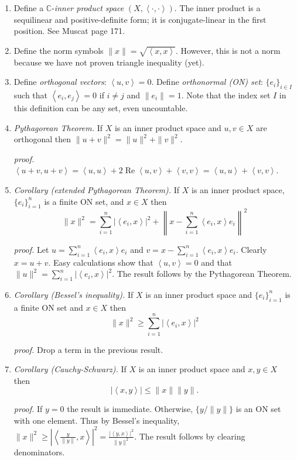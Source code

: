 \documentclass[11pt]{article}
\newcommand{\CC}{\mathbb{C}}
\renewcommand{\Re}{\operatorname{Re}}
\newcommand{\ip}[2]{\ensuremath{\left<#1,#2\right>}}
\begin{document}
\begin{enumerate}
\renewcommand{\labelenumi}{{\Large \textbf{\Alph{enumi}.}}\,}
\item Define a $\CC$-\emph{inner product space} $(X,\ip{\cdot}{\cdot})$.  The inner product is a sequilinear and positive-definite form; it is conjugate-linear in the first position.  See Muscat page 171.

\item Define the norm symbols $\|x\|=\sqrt{\ip{x}{x}}$.  However, this is not a norm because we have not proven triangle inequality (yet).

\item Define \emph{orthogonal vectors}: $\ip{u}{v}=0$.  Define \emph{orthonormal (ON) set}: $\{e_i\}_{i\in I}$ such that $\ip{e_i}{e_j}=0$ if $i\ne j$ and $\|e_i\|=1$.  Note that the index set $I$ in this definition can be any set, even uncountable.

\item \emph{Pythagorean Theorem.}  If $X$ is an inner product space and $u,v\in X$ are orthogonal then $\|u+v\|^2 = \|u\|^2 + \|v\|^2$.

\emph{proof.}  $\ip{u+v}{u+v} = \ip{u}{u} + 2 \Re\ip{u}{v} + \ip v v = \ip{u}{u} + \ip v v$.

\item \emph{Corollary (extended Pythagorean Theorem).}  If $X$ is an inner product space, $\{e_i\}_{i=1}^n$ is a finite ON set, and $x\in X$ then
    $$\|x\|^2 = \sum_{i=1}^n |\ip{e_i}{x}|^2 + \left\|x - \sum_{i=1}^n \ip{e_i}{x} e_i\right\|^2$$

\emph{proof.}  Let $u = \sum_{i=1}^n \ip{e_i}{x} e_i$ and $v = x - \sum_{i=1}^n \ip{e_i}{x} e_i$.  Clearly $x=u+v$.  Easy calculations show that $\ip{u}{v}=0$ and that $\|u\|^2 = \sum_{i=1}^n |\ip{e_i}{x}|^2$.  The result follows by the Pythagorean Theorem.

\item \emph{Corollary (Bessel's inequality).}  If $X$ is an inner product space and $\{e_i\}_{i=1}^n$ is a finite ON set and $x\in X$ then
    $$\|x\|^2 \ge \sum_{i=1}^n |\ip{e_i}{x}|^2$$

\emph{proof.}  Drop a term in the previous result.

\item \emph{Corollary (Cauchy-Schwarz).}  If $X$ is an inner product space and $x,y\in X$ then
    $$|\ip{x}{y}| \le \|x\|\|y\|.$$

\emph{proof.}  If $y=0$ the result is immediate.  Otherwise, $\{y/\|y\|\}$ is an ON set with one element.  Thus by Bessel's inequality, $\|x\|^2 \ge \left|\ip{\frac{y}{\|y\|}}{x}\right|^2 = \frac{|\ip{y}{x}|^2}{\|y\|^2}$.  The result follows by clearing denominators.


\end{enumerate}
\end{document}

